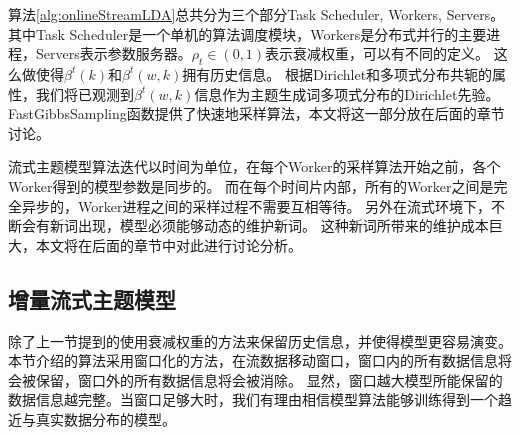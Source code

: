 算法\ref{alg:onlineStreamLDA}总共分为三个部分Task Scheduler, Workers, Servers。其中Task Scheduler是一个单机的算法调度模块，Workers是分布式并行的主要进程，Servers表示参数服务器。$\rho_t \in (0, 1)$表示衰减权重，可以有不同的定义。
这么做使得$\beta^t(k)$和$\beta^t(w, k)$拥有历史信息。
根据Dirichlet和多项式分布共轭的属性，我们将已观测到$\beta^t(w, k)$信息作为主题生成词多项式分布的Dirichlet先验。FastGibbsSampling函数提供了快速地采样算法，本文将这一部分放在后面的章节讨论。

流式主题模型算法迭代以时间为单位，在每个Worker的采样算法开始之前，各个Worker得到的模型参数是同步的。
而在每个时间片内部，所有的Worker之间是完全异步的，Worker进程之间的采样过程不需要互相等待。
另外在流式环境下，不断会有新词出现，模型必须能够动态的维护新词。
这种新词所带来的维护成本巨大，本文将在后面的章节中对此进行讨论分析。

\subsection{增量流式主题模型}
除了上一节提到的使用衰减权重的方法来保留历史信息，并使得模型更容易演变。
本节介绍的算法采用窗口化的方法，在流数据移动窗口，窗口内的所有数据信息将会被保留，窗口外的所有数据信息将会被消除。
显然，窗口越大模型所能保留的数据信息越完整。当窗口足够大时，我们有理由相信模型算法能够训练得到一个趋近与真实数据分布的模型。

